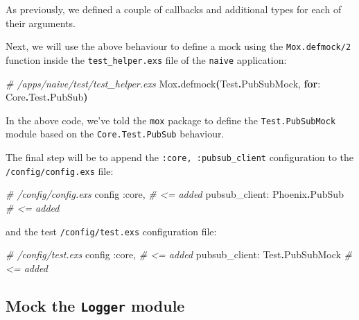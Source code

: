 \documentclass[
  oneside]{book}
\newenvironment{Shaded}{\begin{snugshade}}{\end{snugshade}}
\newcommand{\CommentTok}[1]{\textcolor[rgb]{0.56,0.35,0.01}{\textit{#1}}}
\newcommand{\ConstantTok}[1]{\textcolor[rgb]{0.56,0.35,0.01}{#1}}
\newcommand{\FunctionTok}[1]{\textcolor[rgb]{0.13,0.29,0.53}{\textbf{#1}}}
\newcommand{\KeywordTok}[1]{\textcolor[rgb]{0.13,0.29,0.53}{\textbf{#1}}}
\newcommand{\NormalTok}[1]{#1}
\newcommand{\OperatorTok}[1]{\textcolor[rgb]{0.81,0.36,0.00}{\textbf{#1}}}
\newcommand{\VariableTok}[1]{\textcolor[rgb]{0.00,0.00,0.00}{#1}}
\begin{document}
As previously, we defined a couple of callbacks and additional types for each of their arguments.

\newpage

Next, we will use the above behaviour to define a mock using the \texttt{Mox.defmock/2} function inside the \texttt{test\_helper.exs} file of the \texttt{naive} application:

\begin{Shaded}
\begin{Highlighting}[]
\CommentTok{\# /apps/naive/test/test\_helper.exs}
\ConstantTok{Mox}\OperatorTok{.}\NormalTok{defmock}\FunctionTok{(}\ConstantTok{Test}\OperatorTok{.}\ConstantTok{PubSubMock}\NormalTok{, }\KeywordTok{for}\NormalTok{: }\ConstantTok{Core}\OperatorTok{.}\ConstantTok{Test}\OperatorTok{.}\ConstantTok{PubSub}\FunctionTok{)}
\end{Highlighting}
\end{Shaded}

In the above code, we've told the \texttt{mox} package to define the \texttt{Test.PubSubMock} module based on the \texttt{Core.Test.PubSub} behaviour.

The final step will be to append the \texttt{:core,\ :pubsub\_client} configuration to the \texttt{/config/config.exs} file:

\begin{Shaded}
\begin{Highlighting}[]
\CommentTok{\# /config/config.exs}
\NormalTok{config }\VariableTok{:core}\NormalTok{,                  }\CommentTok{\# \textless{}= added}
  \VariableTok{pubsub\_client:} \ConstantTok{Phoenix}\OperatorTok{.}\ConstantTok{PubSub} \CommentTok{\# \textless{}= added}
\end{Highlighting}
\end{Shaded}

and the test \texttt{/config/test.exs} configuration file:

\begin{Shaded}
\begin{Highlighting}[]
\CommentTok{\# /config/test.exs}
\NormalTok{config }\VariableTok{:core}\NormalTok{,                  }\CommentTok{\# \textless{}= added}
  \VariableTok{pubsub\_client:} \ConstantTok{Test}\OperatorTok{.}\ConstantTok{PubSubMock} \CommentTok{\# \textless{}= added}
\end{Highlighting}
\end{Shaded}

\subsection{\texorpdfstring{Mock the \texttt{Logger} module}{Mock the Logger module}}\label{mock-the-logger-module}
\end{document}
